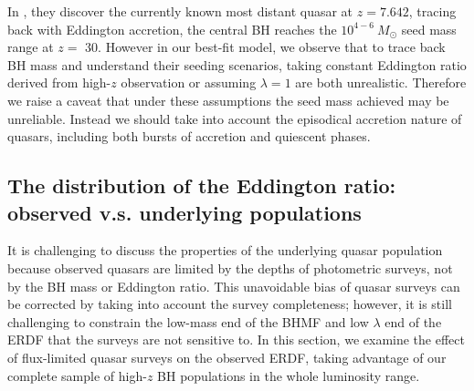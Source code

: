 \documentclass[twocolumn, twocolappendix]{aastex63}
\newcommand{\Msun}{M_\odot}
\newcommand{\tlife}{\tau}
\newcommand{\red}[1]{\textcolor{red}{ #1}}
\begin{document}
\begin{CJK*}{UTF8}{gbsn}
In \citet{2021ApJ...907L...1W}, they discover the currently known most distant quasar at $z=7.642$, 
tracing back with Eddington accretion, the central BH reaches the $10^{4-6}~\Msun$ seed mass range at $z=$ 30. 
However in our best-fit model, we observe that to trace back BH mass and understand their seeding scenarios, 
taking constant Eddington ratio derived from high-$z$ observation or assuming $\lambda=1$ are both unrealistic. 
Therefore we raise a caveat that under these assumptions the seed mass achieved may be unreliable. 
Instead we should take into account the episodical accretion nature of quasars, 
including both bursts of accretion and quiescent phases.





\vspace{2mm}
\subsection{The distribution of the Eddington ratio: \\observed v.s. underlying populations}\label{sec:ldist}

It is challenging to discuss the properties of the underlying quasar population
because observed quasars are limited by the depths of photometric surveys, not by the BH mass or Eddington ratio.
This unavoidable bias of quasar surveys can be corrected by taking into account the survey completeness;
however, it is still challenging to constrain the low-mass end of the BHMF and low $\lambda$ end of the ERDF
that the surveys are not sensitive to.
In this section, we examine the effect of flux-limited quasar surveys on the observed ERDF, 
taking advantage of our complete sample of high-$z$ BH populations in the whole luminosity range. 



\end{CJK*}
\end{document}
